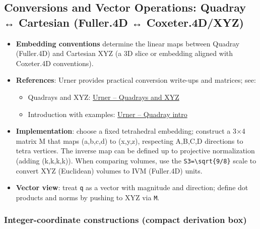 \documentclass[
  10pt,
]{article}
\providecommand{\tightlist}{%
  \setlength{\itemsep}{0pt}\setlength{\parskip}{0pt}}
\begin{document}
\hypertarget{conversions-and-vector-operations-quadray-cartesian-fuller.4d-coxeter.4dxyz}{%
\subsection{Conversions and Vector Operations: Quadray ↔ Cartesian
(Fuller.4D ↔
Coxeter.4D/XYZ)}\label{conversions-and-vector-operations-quadray-cartesian-fuller.4d-coxeter.4dxyz}}

\begin{itemize}
\tightlist
\item
  \textbf{Embedding conventions} determine the linear maps between
  Quadray (Fuller.4D) and Cartesian XYZ (a 3D slice or embedding aligned
  with Coxeter.4D conventions).
\item
  \textbf{References}: Urner provides practical conversion write-ups and
  matrices; see:

  \begin{itemize}
  \tightlist
  \item
    Quadrays and XYZ:
    \href{https://www.grunch.net/synergetics/quadxyz.html}{Urner --
    Quadrays and XYZ}
  \item
    Introduction with examples:
    \href{https://www.grunch.net/synergetics/quadintro.html}{Urner --
    Quadray intro}
  \end{itemize}
\item
  \textbf{Implementation}: choose a fixed tetrahedral embedding;
  construct a 3×4 matrix M that maps (a,b,c,d) to (x,y,z), respecting
  A,B,C,D directions to tetra vertices. The inverse map can be defined
  up to projective normalization (adding (k,k,k,k)). When comparing
  volumes, use the \texttt{S3=\textbackslash{}sqrt\{9/8\}} scale to
  convert XYZ (Euclidean) volumes to IVM (Fuller.4D) units.
\item
  \textbf{Vector view}: treat \texttt{q} as a vector with magnitude and
  direction; define dot products and norms by pushing to XYZ via
  \texttt{M}.
\end{itemize}

\hypertarget{integer-coordinate-constructions-compact-derivation-box}{%
\subsubsection{Integer-coordinate constructions (compact derivation
box)}\label{integer-coordinate-constructions-compact-derivation-box}}
\end{document}
